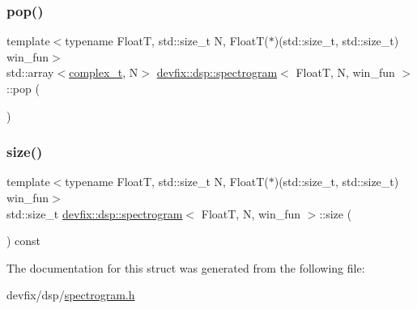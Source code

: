 \subsubsection{\texorpdfstring{pop()}{pop()}}
{\footnotesize\ttfamily template$<$typename FloatT, std\+::size\+\_\+t N, Float\+T($\ast$)(std\+::size\+\_\+t, std\+::size\+\_\+t) win\+\_\+fun$>$ \\
std\+::array$<$\hyperlink{structdevfix_1_1dsp_1_1spectrogram_a920fdda446509cfe81fa287773c709cb}{complex\+\_\+t}, N$>$ \hyperlink{structdevfix_1_1dsp_1_1spectrogram}{devfix\+::dsp\+::spectrogram}$<$ FloatT, N, win\+\_\+fun $>$\+::pop (\begin{DoxyParamCaption}{ }\end{DoxyParamCaption})\hspace{0.3cm}{\ttfamily [inline]}}

\mbox{\label{structdevfix_1_1dsp_1_1spectrogram_a6dc48452751bc4b4f4e14088998ddbb7}} 
\subsubsection{\texorpdfstring{size()}{size()}}
{\footnotesize\ttfamily template$<$typename FloatT, std\+::size\+\_\+t N, Float\+T($\ast$)(std\+::size\+\_\+t, std\+::size\+\_\+t) win\+\_\+fun$>$ \\
std\+::size\+\_\+t \hyperlink{structdevfix_1_1dsp_1_1spectrogram}{devfix\+::dsp\+::spectrogram}$<$ FloatT, N, win\+\_\+fun $>$\+::size (\begin{DoxyParamCaption}{ }\end{DoxyParamCaption}) const\hspace{0.3cm}{\ttfamily [inline]}}



The documentation for this struct was generated from the following file\+:\begin{DoxyCompactItemize}
\item 
devfix/dsp/\hyperlink{spectrogram_8h}{spectrogram.\+h}\end{DoxyCompactItemize}
